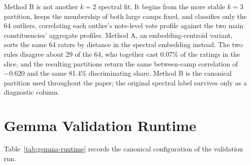 \documentclass[10pt,twocolumn]{article}
\begin{document}
Method B is not another $k=2$ spectral fit. It begins from the more stable
$k=3$ partition, keeps the membership of both large camps fixed, and
classifies only the 64 outliers, correlating each outlier's note-level vote
profile against the two main constituencies' aggregate profiles. Method A, an
embedding-centroid variant, sorts the same 64 raters by distance in the
spectral embedding instead. The two rules disagree about 29 of the 64, who
together cast 0.07\% of the ratings in the slice, and the resulting partitions
return the same between-camp correlation of $-0.620$ and the same 81.4\%
discriminating share. Method B is the canonical partition used throughout the
paper; the original spectral label survives only as a diagnostic column.

\section{Gemma Validation Runtime}
\label{app:gemma-runtime}

Table~\ref{tab:gemma-runtime} records the canonical configuration of the
validation run.
\end{document}

